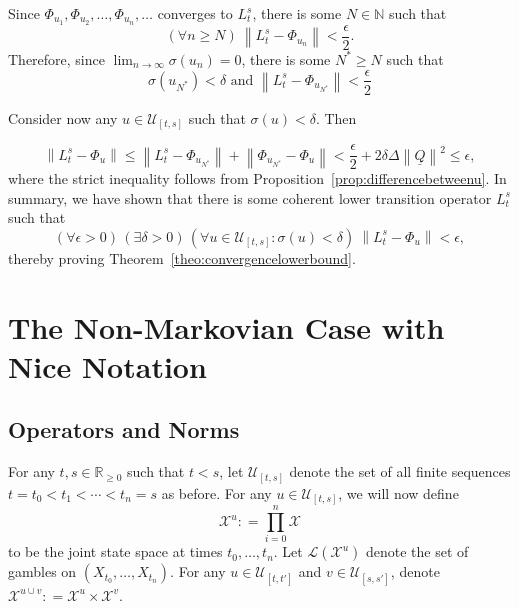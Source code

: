 \documentclass[a4paper,reqno]{amsart}
\newcommand{\nats}{\mathbb{N}}
\newcommand{\reals}{\mathbb{R}}
\newcommand{\realsnonneg}{\reals_{\geq 0}}
\newcommand{\states}{\mathcal{X}}
\newcommand{\lbound}{L}
\newcommand{\gambles}{\mathcal{L}}
\newcommand{\lrate}{\underline{Q}}
\newcommand{\norm}[1]{\left\lVert #1 \right\rVert}
\newcommand{\coloneqq}{:\!=}
\begin{document}
Since $\Phi_{u_1},\Phi_{u_2},\dots,\Phi_{u_n},\dots$ converges to $\lbound_t^s$, there is some $N\in\nats$ such that
\begin{equation*}
(\forall n\geq N)~\norm{\lbound_t^s - \Phi_{u_n}}<\frac{\epsilon}{2}.
\end{equation*}
Therefore, since $\lim_{n\to\infty}\sigma(u_n)=0$, there is some $N^*\geq N$ such that
\begin{equation*}
\sigma(u_{N^*})<\delta\text{ and }\norm{\lbound_t^s - \Phi_{u_{N^*}}}<\frac{\epsilon}{2}
\end{equation*}

Consider now any $u\in\mathcal{U}_{[t,s]}$ such that $\sigma(u)<\delta$. Then

\begin{equation*}
\norm{\lbound_t^s - \Phi_u}\leq\norm{\lbound_t^s-\Phi_{u_{N^*}}}
+\norm{\Phi_{u_{N^*}}-\Phi_u}
<\frac{\epsilon}{2}+2\delta\Delta\norm{\lrate}^2\leq\epsilon,
\end{equation*}
where the strict inequality follows from Proposition~\ref{prop:differencebetweenu}.
In summary, we have shown that there is some coherent lower transition operator $\lbound_t^s$ such that
\begin{equation*}
(\forall\epsilon>0)\,
(\exists\delta>0)\,
(\forall u\in\mathcal{U}_{[t,s]}\colon\sigma(u)<\delta)~\norm{\lbound_t^s - \Phi_u}<\epsilon,
\end{equation*}
thereby proving Theorem~\ref{theo:convergencelowerbound}.

\newpage
\section{The Non-Markovian Case with Nice Notation}

\subsection{Operators and Norms}
For any $t,s \in \realsnonneg$ such that $t < s$, let $\mathcal{U}_{[t,s]}$ denote the set of all finite sequences $t=t_0 < t_1 < \cdots < t_n=s$ as before. For any $u\in\mathcal{U}_{[t,s]}$, we will now define
\begin{equation*}
\states^u\coloneqq \prod_{i=0}^n\states
\end{equation*}
to be the joint state space at times $t_0,\ldots,t_n$. Let $\gambles(\states^u)$ denote the set of gambles on $(X_{t_0},\ldots,X_{t_n})$. For any $u\in\mathcal{U}_{[t,t']}$ and $v\in\mathcal{U}_{[s,s']}$, denote $\states^{u\cup v}\coloneqq\states^u\times\states^v$.
\end{document}
